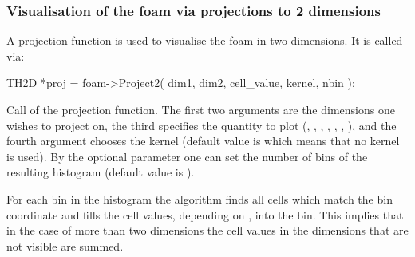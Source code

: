 \subsubsection{Visualisation of the foam via projections to 2 dimensions}
\label{sec:pdefoam-visualise}

A projection function is used to visualise the foam in two dimensions. 
It is called via:

%
\begin{codeexample}
\begin{tmvacode}
TH2D *proj = foam->Project2( dim1, dim2, cell_value, kernel, nbin );
\end{tmvacode}
\caption[.]{\codeexampleCaptionSize Call of the projection function.
  The first two arguments are the dimensions one wishes to project on,
  the third specifies the quantity to plot (,
  , , ,
  , , ), and the fourth
  argument chooses the kernel (default value is  which
  means that no kernel is used).  By the optional parameter
   one can set the number of bins of the resulting
  histogram (default value is ).}
\end{codeexample}

For each bin in the histogram the algorithm finds all cells which
match the bin coordinate and fills the cell values, depending on
, into the bin.  This implies that in the case of
more than two dimensions the cell values in the dimensions that are
not visible are summed.

